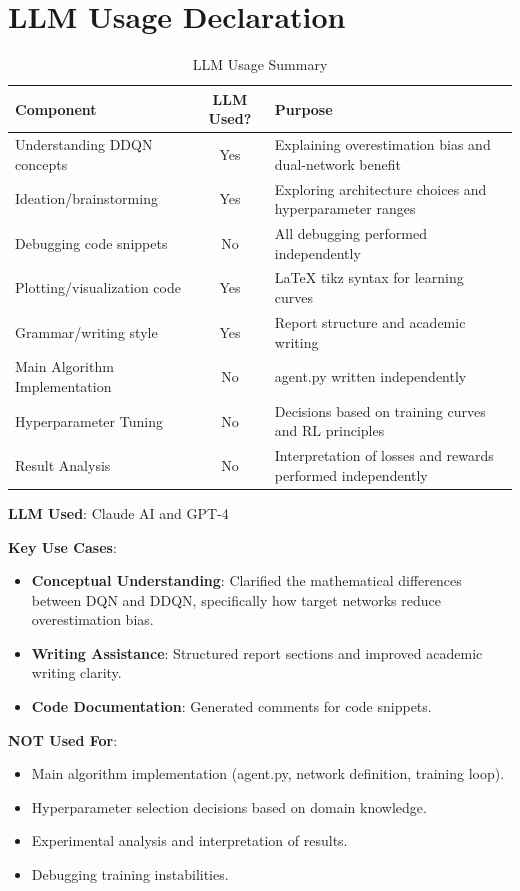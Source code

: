\documentclass[12pt,a4paper]{article}
\begin{document}
\newpage

\section*{LLM Usage Declaration}

\begin{table}[H]
\centering
\caption{LLM Usage Summary}
\begin{tabular}{|p{3.5cm}|c|p{5cm}|}
\hline
\textbf{Component} & \textbf{LLM Used?} & \textbf{Purpose} \\
\hline
Understanding DDQN concepts & Yes & Explaining overestimation bias and dual-network benefit \\
\hline
Ideation/brainstorming & Yes & Exploring architecture choices and hyperparameter ranges \\
\hline
Debugging code snippets & No & All debugging performed independently \\
\hline
Plotting/visualization code & Yes & LaTeX tikz syntax for learning curves \\
\hline
Grammar/writing style & Yes & Report structure and academic writing \\
\hline
Main Algorithm Implementation & No & agent.py written independently \\
\hline
Hyperparameter Tuning & No & Decisions based on training curves and RL principles \\
\hline
Result Analysis & No & Interpretation of losses and rewards performed independently \\
\hline
\end{tabular}
\end{table}

\textbf{LLM Used}: Claude AI and GPT-4

\textbf{Key Use Cases}:
\begin{itemize}
    \item \textbf{Conceptual Understanding}: Clarified the mathematical differences between DQN and DDQN, specifically how target networks reduce overestimation bias.
    \item \textbf{Writing Assistance}: Structured report sections and improved academic writing clarity.
    \item \textbf{Code Documentation}: Generated comments for code snippets.
\end{itemize}

\textbf{NOT Used For}:
\begin{itemize}
    \item Main algorithm implementation (agent.py, network definition, training loop).
    \item Hyperparameter selection decisions based on domain knowledge.
    \item Experimental analysis and interpretation of results.
    \item Debugging training instabilities.
\end{itemize}
\end{document}

